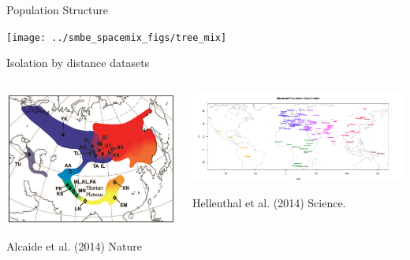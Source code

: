 \documentclass{beamer}
\begin{document}
\begin{frame}{Population Structure}
\pause
	\begin{center} \texttt{[image: ../smbe\_spacemix\_figs/tree\_mix]}
\end{center}

\end{frame}


\begin{frame}{Isolation by distance datasets}
\pause
\begin{columns}
\begin{column}{0.4\textwidth}

	\begin{center} \includegraphics[width=
          0.8
          \textwidth]{../smbe_spacemix_figs/Irwin_warbler_map_figure}
\end{center}
	\vskip -0.5cm
          {\tiny Alcaide et al. (2014) Nature} 
\end{column}
\begin{column}{0.6\textwidth}
\pause 

	\begin{center} \includegraphics[width= 1.1 \textwidth, height = 0.6 \textheight]{../smbe_spacemix_figs/globe_obs_map_option2}
 \end{center}
          {\tiny Hellenthal et al. (2014) Science.}  
\end{column}
\end{columns}
\end{frame}
\end{document}
